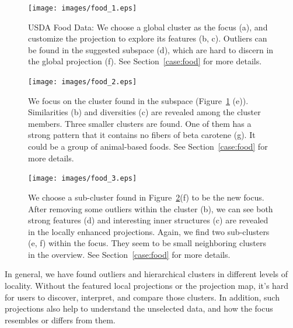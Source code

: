 \begin{figure}[htbp]
\centering
  \texttt{[image: images/food\_1.eps]}%
  \caption{USDA Food Data: We choose a global cluster as the focus (a), and customize the projection to explore its features (b, c). Outliers can be found in the suggested subspace (d), which are hard to discern in the global projection (f). See Section~\ref{case:food} for more details.}
\label{fig:food1}
  \end{figure}

\begin{figure}[htbp]
\centering
  \texttt{[image: images/food\_2.eps]}%
  \caption{We focus on the cluster found in the subspace (Figure~\ref{fig:food1} (e)). Similarities (b) and diversities (c) are revealed among the cluster members. Three smaller clusters are found. One of them has a strong pattern that it contains no fibers of beta carotene (g). It could be a group of animal-based foods. See Section~\ref{case:food} for more details.}
\label{fig:food2}
  \end{figure}

\begin{figure}[htbp]
\centering
  \texttt{[image: images/food\_3.eps]}%
  \caption{We choose a sub-cluster found in Figure~\ref{fig:food2}(f) to be the new focus. After removing some outliers within the cluster (b), we can see both strong features (d) and interesting inner structures (c) are revealed in the locally enhanced projections. Again, we find two sub-clusters (e, f) within the focus. They seem to be small neighboring clusters in the overview. See Section~\ref{case:food} for more details.}
\label{fig:food3}
  \end{figure}

 In general, we have found outliers and hierarchical clusters in different levels of locality. Without the featured local projections or the projection map, it's hard for users to discover, interpret, and compare those clusters. In addition, such projections also help to understand the unselected data, and how the focus resembles or differs from them.

